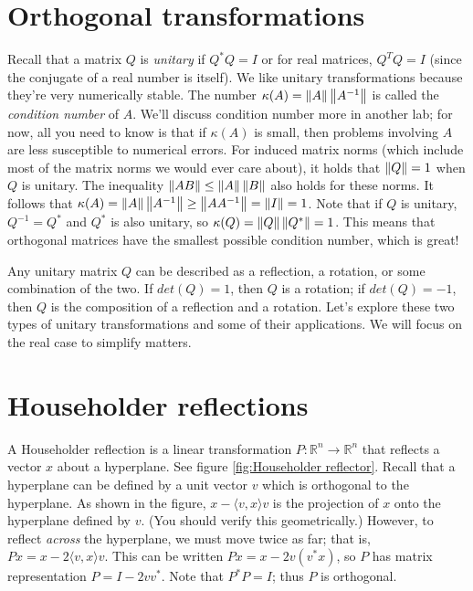 \label{lab:Canonical Transformations}

\section*{Orthogonal transformations}
Recall that a matrix $Q$ is \emph{unitary} if $Q^* Q = I$ or for real matrices, 
$Q^T Q = I$ (since the conjugate of a real number is itself).
We like unitary transformations because they're very numerically stable.
The number $\kappa(A) = \left\lVert A\right\rVert \left\lVert A^{-1}\right\rVert$ is called the \emph{condition number} of $A$.
We'll discuss condition number more in another lab; for now, all you need to know is that if $\kappa(A)$ is small, then problems involving $A$ are less susceptible to numerical errors.
For induced matrix norms (which include most of the matrix norms we would ever care about), it holds that $\left\lVert Q\right\rVert=1$ when $Q$ is unitary.
The inequality $\left\lVert AB\right\rVert \leq \left\lVert A\right\rVert \left\lVert B\right\rVert$ also holds for these norms.
It follows that $\kappa(A) = \left\lVert A\right\rVert \left\lVert A^{-1}\right\rVert \geq \left\lVert A A^{-1}\right\rVert = \left\lVert I\right\rVert = 1$.
Note that if $Q$ is unitary, $Q^{-1} = Q^*$ and $Q^*$ is also unitary, so $\kappa(Q) = \left\lVert Q\right\rVert \left\lVert Q^*\right\rVert = 1$.
This means that orthogonal matrices have the smallest possible condition number, which is great!

Any unitary matrix $Q$ can be described as a reflection, a rotation, or some combination of the two.
If $det(Q) = 1$, then $Q$ is a rotation; if $det(Q) = -1$, then $Q$  is the composition of a reflection and a rotation.
Let's explore these two types of unitary transformations and some of their applications.
We will focus on the real case to simplify matters.

\section*{Householder reflections}
A Householder reflection is a linear transformation $P: \mathbb{R}^n \rightarrow \mathbb{R}^n$ that reflects a vector $x$ about a hyperplane.
See figure \ref{fig:Householder reflector}. Recall that a hyperplane can be defined by a unit vector $v$ which is orthogonal to the hyperplane.
As shown in the figure, $x - \langle v,x \rangle v$ is the projection of $x$ onto the hyperplane defined by $v$.
(You should verify this geometrically.) However, to reflect \emph{across} the hyperplane, we must move twice as far; that is, $Px = x - 2\langle v,x \rangle v$.
This can be written $Px = x - 2v(v^\ast x)$, so $P$ has matrix representation $P = I - 2vv^\ast$. Note that $P^\ast P = I$; thus $P$ is orthogonal.

